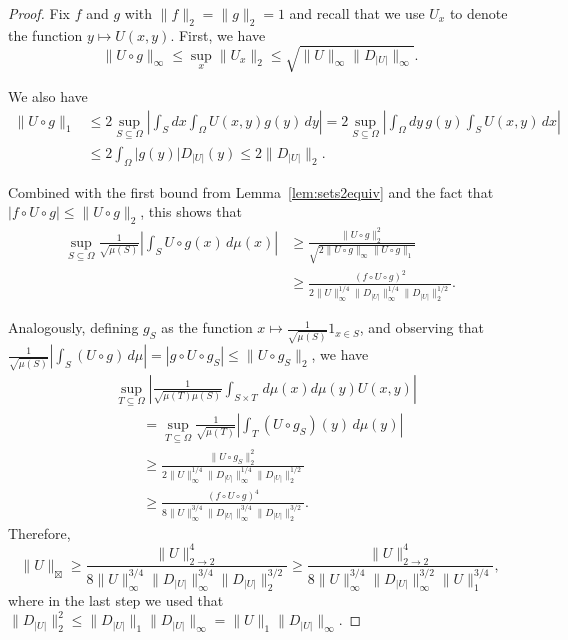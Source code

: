 \documentclass{amsart}
\numberwithin{equation}{section}
\numberwithin{figure}{section}
\theoremstyle{definition}
\theoremstyle{remark}
\newcommand{\jbl}{{\boxtimes}}
\begin{document}
\begin{proof}
Fix $f$ and $g$ with $\|f\|_2=\|g\|_2=1$ and recall that we use $U_x$ to
denote the function $y\mapsto U(x,y)$. First, we have
\[\|U \circ g\|_\infty \le \sup_x \|U_x\|_2\le \sqrt{\|U\|_\infty
\|D_{|U|}\|_\infty}.
\]

We also have
\begin{align*}
\|U \circ g\|_1 &\le 2 \sup_{S \subseteq \Omega} \left| \int_{S}dx \int_\Omega U(x,y) g(y)\,dy \right|
=2 \sup_{S \subseteq \Omega} \left| \int_\Omega dy \,g(y) \int_S U(x,y)\,dx \right|
\\
&\le 2 \int_\Omega |g(y)| D_{|U|}(y) \le 2\|D_{|U|}\|_2.
\end{align*}

Combined with the first bound from Lemma~\ref{lem:sets2equiv} and the fact
that $ |f\circ U\circ g|\leq \|U\circ g\|_2$, this shows that
\begin{align*}
\sup_{S\subseteq\Omega}\frac{1}{\sqrt{\mu(S)}}
\left|\int_{S} U \circ g(x) \,d\mu(x)\right|
&\ge \frac{\|U \circ g\|^2_2}{\sqrt{2\|U \circ g\|_\infty\|U \circ g\|_1}}\\
&\ge \frac{(f \circ U \circ g)^2}{2\|U\|_\infty^{1/4}\|D_{|U|}\|_\infty^{1/4}\|D_{|U|}\|_2^{1/2} }.
\end{align*}

Analogously, defining $g_S$ as the function $x\mapsto\frac
1{\sqrt{\mu(S)}}1_{x\in S}$, and observing that $\frac
1{\sqrt{\mu(S)}}\left|\int_S (U\circ g)\,d\mu\right|=\left|g\circ U\circ g_S
\right|\leq \|U\circ g_S\|_2$, we have
\begin{align*}
&\sup_{T \subseteq \Omega}
\left|\frac{1}{\sqrt{\mu(T)\mu(S)}}\int_{S\times T}\,d\mu(x) d\mu(y)U(x,y)\right|\\
&\qquad=\sup_{T \subseteq \Omega}
\frac{1}{\sqrt{\mu(T)}}\left|\int_T(U\circ g_S)(y) \,d\mu(y)\right|
\\
&\qquad\ge \frac{\| U \circ g_S\|_2^2}{2 \|U\|_\infty^{1/4} \|D_{|U|}\|_\infty^{1/4}\|D_{|U|}\|_2^{1/2} }\\
&\qquad\ge \frac{(f \circ U \circ g)^4}{8\|U\|_\infty^{3/4}\|D_{|U|}\|_\infty^{3/4}\|D_{|U|}\|_2^{3/2}}.
\end{align*}
Therefore,
\[\|U\|_{\jbl} \ge \frac{\|U\|_{2 \rightarrow2}^4}{8\|U\|_\infty^{3/4}\|D_{|U|}\|_\infty^{3/4}\|D_{|U|}\|_2^{3/2}}
\geq \frac{\|U\|_{2 \rightarrow2}^4}{8\|U\|_\infty^{3/4}\|D_{|U|}\|_\infty^{3/2}\|U\|_1^{3/4}},
\]
where in the last step we used that $\|D_{|U|}\|_2^2 \leq \|D_{|U|}\|_1\|D_{|U|}\|_\infty=\|U\|_1\|D_{|U|}\|_\infty$.
\end{proof}
\end{document}
